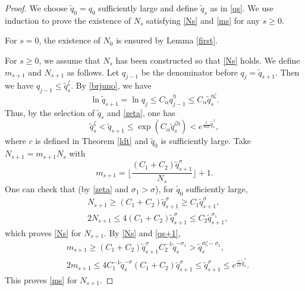 \documentclass[reqno,12pt]{amsart}
\theoremstyle{plain}
\theoremstyle{definition}
\numberwithin{equation}{section}
\begin{document}
\begin{proof}
We choose $\tilde{q}_{0}=q_{0}$ sufficiently large and define $\tilde{q}_{s}$ as in \eqref{qs}. We use induction to prove the existence of $N_{s}$ satisfying \eqref{Ns} and \eqref{ms} for any $s\geqslant 0$.

For $s=0$, the existence of $N_{0}$ is ensured by Lemma \ref{first}.

For $s\geqslant 0$, we assume that $N_{s}$ has been constructed so that \eqref{Ns} holds. We define $m_{s+1}$ and $N_{s+1}$ as follows.
Let $q_{j-1}$ be the denominator before $q_{j}=\tilde{q}_{s+1}$. Then we have $q_{j-1}\leqslant \tilde{q}_{s}^{\zeta}$. By \eqref{brjuno}, we have
\begin{equation*}
    \ln \tilde{q}_{s+1} =\ln q_{j}\leqslant C_{\alpha} q_{j-1}^{\eta} \leqslant C_{\alpha}\tilde{q}_{s}^{\eta\zeta}.
\end{equation*}
Thus, by the selection of $\tilde{q}_{s}$ and \eqref{zeta}, one has
\begin{equation}\label{qs+1}
    \tilde{q}_{s}^{\zeta}<\tilde{q}_{s+1} \leqslant  \exp(C_{\alpha}\tilde{q}_{s}^{\zeta \eta}) < e^{\frac{c}{10\sigma}\tilde{q}_{s}^{\gamma}},
\end{equation}
where $c$ is defined in Theorem \ref{ldt} and $\tilde{q}_{0}$ is sufficiently large.
Take $N_{s+1}=m_{s+1}N_{s}$ with \begin{equation*}
    m_{s+1}=\bigg\lfloor\frac{ (C_{1}+C_{2})\tilde{q}_{s+1}^{\sigma}}{N_{s}}\bigg\rfloor+1.
\end{equation*}
One can check that (by \eqref{zeta} and $\sigma_{1}>\sigma$), for $\tilde{q}_{0}$ sufficiently large,
\begin{equation*}
    \begin{split}
        &N_{s+1}\geqslant  (C_{1}+C_{2})\tilde{q}_{s+1}^{\sigma}\geqslant C_{1}\tilde{q}_{s+1}^{\sigma}, \\
        &2N_{s+1}\leqslant 4 (C_{1}+C_{2})\tilde{q}_{s+1}^{\sigma} \leqslant C_{2}\tilde{q}_{s+1}^{\sigma_{1}},
    \end{split}
\end{equation*}
which proves \eqref{Ns} for $N_{s+1}$. By \eqref{Ns} and \eqref{qs+1},
\begin{equation*}
    \begin{split}
        &m_{s+1}\geqslant  (C_{1}+C_{2})\tilde{q}_{s+1}^{\sigma} C_{2}^{-1}\tilde{q}_{s}^{-\sigma_{1}} >\tilde{q}_{s}^{\sigma \zeta-\sigma_{1}},\\
        &2m_{s+1}\leqslant 4C_{1}^{-1}\tilde{q}_{s}^{-\sigma}(C_{1}+C_{2})\tilde{q}_{s+1}^{\sigma} \leqslant \tilde{q}_{s+1}^{\sigma} \leqslant  e^{\frac{c}{10}\tilde{q}_{s}^{\gamma}}.
    \end{split}
\end{equation*}
This proves \eqref{ms} for $N_{s+1}$.
\end{proof}
\end{document}

